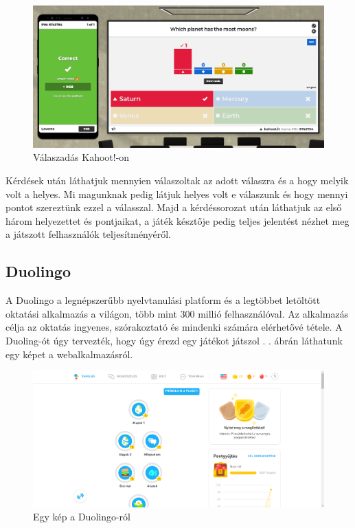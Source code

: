 \begin{figure}[h]
  \centering
  \includegraphics[width=\textwidth]{images/kahoot_play2.png}
  \caption{Válaszadás Kahoot!-on}
\end{figure}
Kérdések után láthatjuk mennyien válaszoltak az adott válaszra és a hogy melyik volt a helyes. Mi magunknak pedig látjuk helyes volt e válaszunk és hogy mennyi pontot szereztünk ezzel a válasszal. Majd a kérdéssorozat után láthatjuk az első három helyezettet és pontjaikat, a játék késztője pedig teljes jelentést nézhet meg a játszott felhasználók teljesítményéről.

\subsection{Duolingo}
A Duolingo a legnépszerűbb nyelvtanulási platform és a legtöbbet letöltött oktatási alkalmazás a világon, több mint 300 millió felhasználóval. Az alkalmazás célja az oktatás ingyenes, szórakoztató és mindenki számára elérhetővé tétele. A Duoling-ót úgy tervezték, hogy úgy érezd egy játékot játszol \cite{whatIsDuolingo}.
. ábrán láthatunk egy képet a webalkalmazásról.

\begin{figure}[h]
  \centering
  \includegraphics[width=\textwidth]{images/Duolingo_main_page.png}
  \caption{Egy kép a Duolingo-ról}
  \label{fig:duolingo}
\end{figure}

